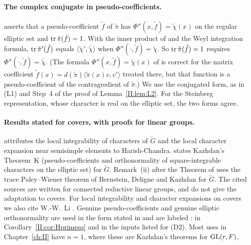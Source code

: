 \paragraph{The complex conjugate in pseudo-coefficients.} \cite[\S25.1, Theorem]{FK86} asserts that a pseudo-coefficient $\tilde f$ of $\tilde\pi$ has $\Phi''(x,\tilde f)=\tilde\chi(x)$ on the regular elliptic set and $\operatorname{tr}\tilde\pi(\tilde f)=1$. With the inner product of \cite[\S24]{FK86} and the Weyl integration formula, $\operatorname{tr}\tilde\pi'(\tilde f)$ equals $\langle\tilde\chi',\overline{\tilde\chi}\rangle$ when $\Phi''(\cdot,\tilde f)=\tilde\chi$. So $\operatorname{tr}\tilde\pi(\tilde f)=1$ requires $\Phi''(\cdot,\tilde f)=\overline{\tilde\chi}$. (The formula $\Phi''(x,\tilde f)=\tilde\chi(x)$ of \cite[\S13(ii)]{FK86} is correct for the matrix coefficient $\tilde f(x)=d(\tilde\pi)\langle\tilde\pi(x)v,v'\rangle$ treated there, but that function is a pseudo-coefficient of the contragredient of $\tilde\pi$.) We use the conjugated form, as in (L1) and Step~4 of the proof of Lemma~\ref{II:lem:L2}. For the Steinberg representation, whose character is real on the elliptic set, the two forms agree.

\paragraph{Results stated for covers, with proofs for linear groups.} \cite[\S13]{FK86} attributes the local integrability of characters of $\widetilde G$ and the local character expansion near semisimple elements to Harish-Chandra. \cite[\S25.1]{FK86} states Kazhdan's Theorem~K \cite{Kaz86} (pseudo-coefficients and orthonormality of square-integrable characters on the elliptic set) for $\widetilde G$. Remark~(ii) after the Theorem of \cite[\S13]{FK86} uses the trace Paley--Wiener theorem of Bernstein, Deligne and Kazhdan for $\widetilde G$. The cited sources are written for connected reductive linear groups, and \cite{FK86} do not give the adaptation to covers. For local integrability and character expansions on covers we also cite W.-W.~Li \cite{Li12}. Genuine pseudo-coefficients and genuine elliptic orthonormality are used in the form stated in \cite{FK86} and are labeled \Ev: in Corollary~\ref{II:cor:Hprimesq} and in the inputs listed for (D2). Most uses in Chapter~\ref{ch:II} have $n=1$, where these are Kazhdan's theorems for $\operatorname{GL}(r,F)$.

